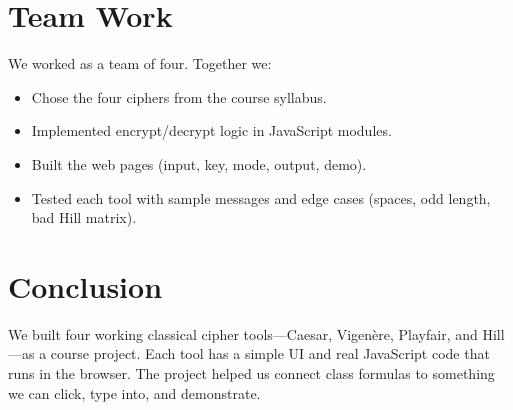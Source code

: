 \documentclass[12pt,a4paper]{article}
\begin{document}
\section{Team Work}

We worked as a team of four. Together we:
\begin{itemize}[leftmargin=*]
  \item Chose the four ciphers from the course syllabus.
  \item Implemented encrypt/decrypt logic in JavaScript modules.
  \item Built the web pages (input, key, mode, output, demo).
  \item Tested each tool with sample messages and edge cases (spaces, odd length, bad Hill matrix).
\end{itemize}

\section{Conclusion}

We built four working classical cipher tools---Caesar, Vigen\`{e}re, Playfair, and Hill---as a course project. Each tool has a simple UI and real JavaScript code that runs in the browser. The project helped us connect class formulas to something we can click, type into, and demonstrate.
\end{document}

